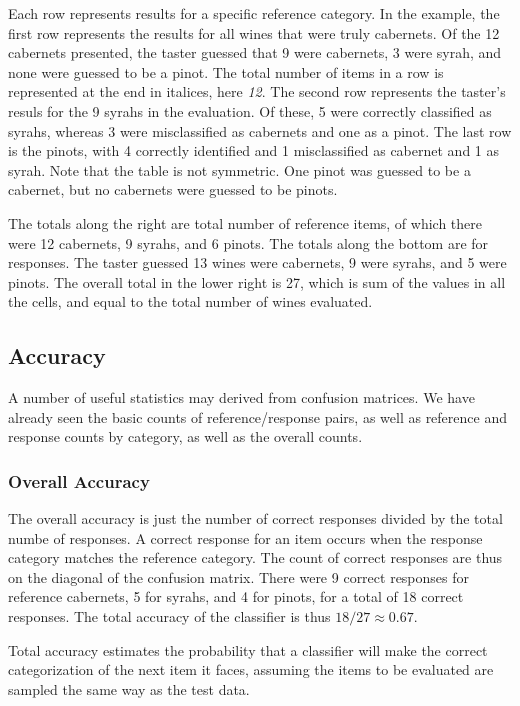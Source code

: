 %
Each row represents results for a specific reference category.  In the
example, the first row represents the results for all wines that were
truly cabernets.  Of the 12 cabernets presented, the taster guessed
that 9 were cabernets, 3 were syrah, and none were guessed to be a
pinot.  The total number of items in a row is represented at the end
in italices, here {\it 12}.  The second row represents the taster's
resuls for the 9 syrahs in the evaluation.  Of these, 5 were correctly
classified as syrahs, whereas 3 were misclassified as cabernets and
one as a pinot.  The last row is the pinots, with 4 correctly
identified and 1 misclassified as cabernet and 1 as syrah.  Note that
the table is not symmetric.  One pinot was guessed to be a cabernet,
but no cabernets were guessed to be pinots.  

The totals along the right are total number of reference items, of
which there were 12 cabernets, 9 syrahs, and 6 pinots.  The totals
along the bottom are for responses.  The taster guessed 13 wines were
cabernets, 9 were syrahs, and 5 were pinots.  The overall total in the
lower right is 27, which is sum of the values in all the cells, and
equal to the total number of wines evaluated.

\subsection{Accuracy}

A number of useful statistics may derived from confusion matrices.  We
have already seen the basic counts of reference/response pairs, as
well as reference and response counts by category, as well as the overall counts.

\subsubsection{Overall Accuracy}

The overall accuracy is just the number of correct responses divided
by the total numbe of responses.  A correct response for an item
occurs when the response category matches the reference category.  The
count of correct responses are thus on the diagonal of the confusion
matrix.  There were 9 correct responses for reference cabernets, 5 for
syrahs, and 4 for pinots, for a total of 18 correct responses.  The
total accuracy of the classifier is thus $18/27 \approx 0.67$.  

Total accuracy estimates the probability that a classifier will make
the correct categorization of the next item it faces, assuming the
items to be evaluated are sampled the same way as the test data.


